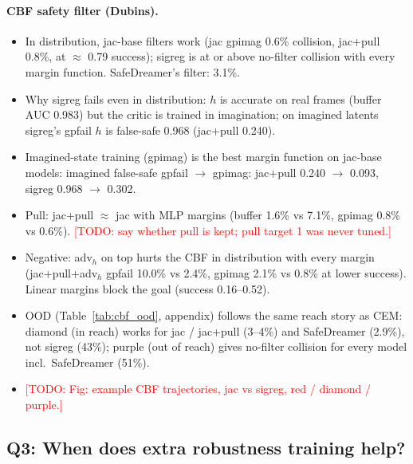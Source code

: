 \documentclass{article}
\newcommand{\todo}[1]{\textcolor{red}{[TODO: #1]}}
\begin{document}
\paragraph{CBF safety filter (Dubins).}
\begin{itemize}
  \item In distribution, jac-base filters work (jac gpimag 0.6\% collision, jac+pull 0.8\%, at $\approx$ 0.79 success); sigreg is at or above no-filter collision with every margin function. SafeDreamer's filter: 3.1\%.
  \item Why sigreg fails even in distribution: $h$ is accurate on real frames (buffer AUC 0.983) but the critic is trained in imagination; on imagined latents sigreg's gpfail $h$ is false-safe 0.968 (jac+pull 0.240).
  \item Imagined-state training (gpimag) is the best margin function on jac-base models: imagined false-safe gpfail $\to$ gpimag: jac+pull 0.240 $\to$ 0.093, sigreg 0.968 $\to$ 0.302.
  \item Pull: jac+pull $\approx$ jac with MLP margins (buffer 1.6\% vs 7.1\%, gpimag 0.8\% vs 0.6\%). \todo{say whether pull is kept; pull target 1 was never tuned.}
  \item Negative: adv$_h$ on top hurts the CBF in distribution with every margin (jac+pull+adv$_h$ gpfail 10.0\% vs 2.4\%, gpimag 2.1\% vs 0.8\% at lower success). Linear margins block the goal (success 0.16--0.52).
  \item OOD (Table~\ref{tab:cbf_ood}, appendix) follows the same reach story as CEM: diamond (in reach) works for jac / jac+pull (3--4\%) and SafeDreamer (2.9\%), not sigreg (43\%); purple (out of reach) gives no-filter collision for every model incl.\ SafeDreamer (51\%).
  \item \todo{Fig: example CBF trajectories, jac vs sigreg, red / diamond / purple.}
\end{itemize}

\subsection{Q3: When does extra robustness training help?}
\label{sec:adv}
\end{document}

